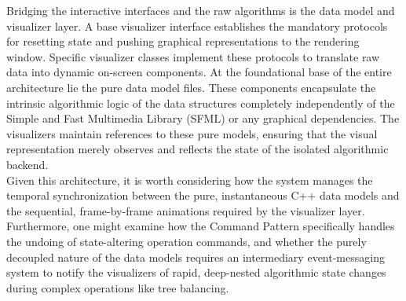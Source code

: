Bridging the interactive interfaces and the raw algorithms is the data model and visualizer layer. A base visualizer interface establishes the mandatory protocols for resetting state and pushing graphical representations to the rendering window. Specific visualizer classes implement these protocols to translate raw data into dynamic on-screen components. At the foundational base of the entire architecture lie the pure data model files. These components encapsulate the intrinsic algorithmic logic of the data structures completely independently of the Simple and Fast Multimedia Library (SFML) or any graphical dependencies. The visualizers maintain references to these pure models, ensuring that the visual representation merely observes and reflects the state of the isolated algorithmic backend.\\

Given this architecture, it is worth considering how the system manages the temporal synchronization between the pure, instantaneous C++ data models and the sequential, frame-by-frame animations required by the visualizer layer. Furthermore, one might examine how the Command Pattern specifically handles the undoing of state-altering operation commands, and whether the purely decoupled nature of the data models requires an intermediary event-messaging system to notify the visualizers of rapid, deep-nested algorithmic state changes during complex operations like tree balancing.

\clearpage